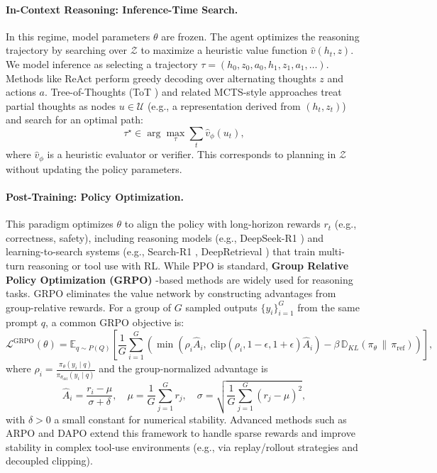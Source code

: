 \paragraph{In-Context Reasoning: Inference-Time Search.}
In this regime, model parameters $\theta$ are frozen. The agent optimizes the reasoning trajectory by searching over $\mathcal{Z}$ to maximize a heuristic value function $\hat{v}(h_t, z)$.
We model inference as selecting a trajectory $\tau = (h_0, z_0, a_0, h_1, z_1, a_1, \ldots)$.
Methods like ReAct \citep{yao2023react} perform greedy decoding over alternating thoughts $z$ and actions $a$.
Tree-of-Thoughts (ToT \citep{yao2023tree}) and related MCTS-style approaches treat partial thoughts as nodes $u \in \mathcal{U}$ (e.g., a representation derived from $(h_t,z_t)$) and search for an optimal path:
\begin{equation}
\tau^\star \in \arg\max_{\tau} \sum_{t} \hat{v}_\phi(u_t),
\end{equation}
where $\hat{v}_\phi$ is a heuristic evaluator or verifier. This corresponds to planning in $\mathcal{Z}$ without updating the policy parameters.

\paragraph{Post-Training: Policy Optimization.}
This paradigm optimizes $\theta$ to align the policy with long-horizon rewards $r_t$ (e.g., correctness, safety), including reasoning models (e.g., DeepSeek-R1 \citep{guo2025deepseekr1}) and learning-to-search systems (e.g., Search-R1 \citep{jin2025search}, DeepRetrieval \citep{jiang2025deepretrieval}) that train multi-turn reasoning or tool use with RL.
While PPO \citep{schulman2017proximal} is standard, \textbf{Group Relative Policy Optimization (GRPO)} \citep{shao2024deepseekmath}-based methods are widely used for reasoning tasks. GRPO eliminates the value network by constructing advantages from group-relative rewards.
For a group of $G$ sampled outputs $\{y_i\}_{i=1}^G$ from the same prompt $q$, a common GRPO objective is:
\begin{equation}
\mathcal{L}^{\text{GRPO}}(\theta)
= \mathbb{E}_{q \sim P(Q)} \left[
\frac{1}{G} \sum_{i=1}^G
\left(
\min\!\left( \rho_i \hat{A}_i,\; \mathrm{clip}(\rho_i, 1-\epsilon, 1+\epsilon)\hat{A}_i \right)
- \beta\, \mathbb{D}_{KL}(\pi_\theta \,\|\, \pi_{\text{ref}})
\right)
\right],
\end{equation}
where $\rho_i = \frac{\pi_\theta(y_i \mid q)}{\pi_{\theta_{\text{old}}}(y_i \mid q)}$ and the group-normalized advantage is
\begin{equation}
\hat{A}_i
= \frac{r_i - \mu}{\sigma + \delta},\quad
\mu=\frac{1}{G}\sum_{j=1}^G r_j,\quad
\sigma=\sqrt{\frac{1}{G}\sum_{j=1}^G (r_j-\mu)^2},
\end{equation}
with $\delta>0$ a small constant for numerical stability.
Advanced methods such as ARPO \citep{lu2025arpo} and DAPO \citep{yu2025dapo} extend this framework to handle sparse rewards and improve stability in complex tool-use environments (e.g., via replay/rollout strategies and decoupled clipping).

